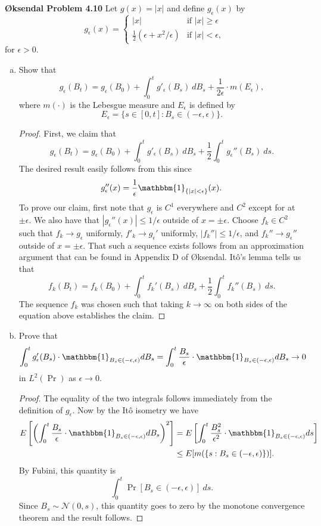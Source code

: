 \documentclass[11pt,letterpaper]{report}
\newcommand{\mcal}[1]{\mathcal{#1}}
\newcommand{\ind}{\mathbbm{1}}
\begin{document}
\noindent\textbf{\O ksendal Problem 4.10}
Let $g(x) = |x|$ and define $g_\epsilon(x)$ by
\[
g_\epsilon(x) = \begin{cases}
	|x|&\text{if }|x|\geq \epsilon\\
	\frac{1}{2}(\epsilon + x^2/\epsilon)&\text{if }|x|<\epsilon,
\end{cases}
\]
for $\epsilon>0$.
\begin{enumerate}[(a)]
	\item Show that
	\[
	g_\epsilon(B_t) = g_\epsilon(B_0) + \int_0^tg'_\epsilon(B_s)\ dB_s + \frac{1}{2\epsilon}\cdot m(E_\epsilon),
	\]
	where $m(\cdot)$ is the Lebesgue measure and $E_\epsilon$ is defined by
	\[
	E_\epsilon = \{s\in [0,t]: B_s\in (-\epsilon, \epsilon)\}.
	\]
	\begin{proof}
		First, we claim that
		\[
		g_\epsilon(B_t) = g_\epsilon(B_0) + \int_0^tg'_\epsilon(B_s)\ dB_s + \frac{1}{2}\int_0^tg_\epsilon''(B_s)\ ds.
		\]
		The desired result easily follows from this since
		\[
		g_\epsilon''(x) = \frac{1}{\epsilon}\ind_{\{|x|<\epsilon\}}(x).
		\]
		To prove our claim, first note that $g_\epsilon$ is $C^1$ everywhere and $C^2$ except for at $\pm \epsilon$. We also have that $|g_\epsilon''(x)|\leq 1/\epsilon$ outside of $x=\pm \epsilon$. Choose $f_k\in C^2$ such that $f_k\to g_\epsilon$ uniformly, $f'_k\to g_\epsilon'$ uniformly, $|f_k''|\leq 1/\epsilon$, and $f_k''\to g_\epsilon''$ outside of $x=\pm \epsilon$. That such a sequence exists follows from an approximation argument that can be found in Appendix D of \O ksendal. It\^o's lemma tells us that
		\[
		f_k(B_t)= f_k(B_0) + \int_0^tf_k'(B_s)\ dB_s + \frac{1}{2}\int_0^t f_k''(B_s)\ ds.
		\]
		The sequence $f_k$ was chosen such that taking $k\to \infty$ on both sides of the equation above establishes the claim.
	\end{proof}

	\item Prove that
	\[
	\int_0^tg'_\epsilon(B_s)\cdot \ind_{B_s\in (-\epsilon, \epsilon)}dB_s = \int_0^t\frac{B_s}{\epsilon}\cdot \ind_{B_s\in (-\epsilon, \epsilon)}dB_s \to 0
	\]
	in $L^2(\Pr)$ as $\epsilon\to 0$.
	\begin{proof}
		The equality of the two integrals follows immediately from the definition of $g_\epsilon$. Now by the It\^o isometry we have
		\begin{align*}
			E\left[\left( \int_0^t\frac{B_s}{\epsilon}\cdot \ind_{B_s\in (-\epsilon, \epsilon)}dB_s \right)^2\right] &= E\left[\int_0^t\frac{B_s^2}{\epsilon^2}\cdot \ind_{B_s\in (-\epsilon, \epsilon)}ds \right]\\
			&\leq E[m(\{s: B_s\in (-\epsilon, \epsilon)\})].
		\end{align*}
		By Fubini, this quantity is 
		\[
		\int_0^t\Pr[B_s\in (-\epsilon, \epsilon)]\ ds.
		\]
		Since $B_s\sim \mcal{N}(0, s)$, this quantity goes to zero by the monotone convergence theorem and the result follows.
	\end{proof}


\end{enumerate}
\end{document}
